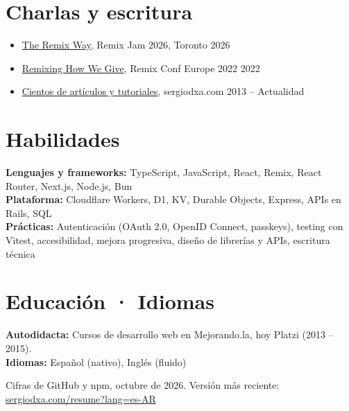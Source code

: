 \documentclass[10pt,letterpaper]{article}
\begin{document}
\section*{Charlas y escritura}
\begin{itemize}
\item \href{https://www.youtube.com/watch?v=o07u1oKE6VA}{The Remix Way}, Remix Jam 2026, Toronto \hfill {\color{muted}2026}
\item \href{https://www.youtube.com/watch?v=eh6FfHFpYMM}{Remixing How We Give}, Remix Conf Europe 2022 \hfill {\color{muted}2022}
\item \href{https://sergiodxa.com}{Cientos de artículos y tutoriales}, sergiodxa.com \hfill {\color{muted}2013 – Actualidad}
\end{itemize}

\section*{Habilidades}
\textbf{Lenguajes y frameworks:} TypeScript, JavaScript, React, Remix, React Router, Next.js, Node.js, Bun\\
\textbf{Plataforma:} Cloudflare Workers, D1, KV, Durable Objects, Express, APIs en Rails, SQL\\
\textbf{Prácticas:} Autenticación (OAuth 2.0, OpenID Connect, passkeys), testing con Vitest, accesibilidad, mejora progresiva, diseño de librerías y APIs, escritura técnica\\

\section*{Educación · Idiomas}
\textbf{Autodidacta:} Cursos de desarrollo web en Mejorando.la, hoy Platzi (2013 – 2015).\\
\textbf{Idiomas:} Español (nativo), Inglés (fluido)

\vfill
{\footnotesize\color{muted}Cifras de GitHub y npm, octubre de 2026. Versión más reciente: \href{https://sergiodxa.com/resume?lang=es-AR}{sergiodxa.com/resume?lang=es-AR}}
\end{document}
